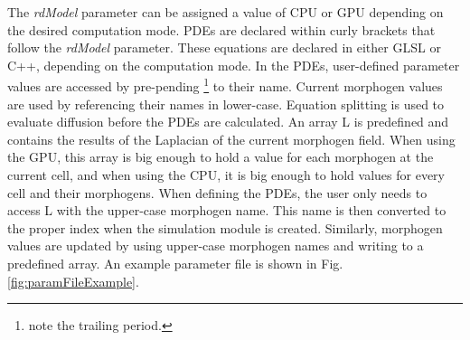 The \textit{rdModel} parameter can be assigned a value of CPU or GPU depending on the desired computation mode. PDEs are declared within curly brackets that follow the \textit{rdModel} parameter. These equations are declared in either GLSL or C++, depending on the computation mode. In the PDEs, user-defined parameter values are accessed by pre-pending \footnote{note the trailing period.} to their name. Current morphogen values are used by referencing their names in lower-case. Equation splitting is used to evaluate diffusion before the PDEs are calculated. An array L is predefined and contains the results of the Laplacian of the current morphogen field. When using the GPU, this array is big enough to hold a value for each morphogen at the current cell, and when using the CPU, it is big enough to hold values for every cell and their morphogens. When defining the PDEs, the user only needs to access L with the upper-case morphogen name. This name is then converted to the proper index when the simulation module is created. Similarly, morphogen values are updated by using upper-case morphogen names and writing to a predefined  array. An example parameter file is shown in Fig. \ref{fig:paramFileExample}.

